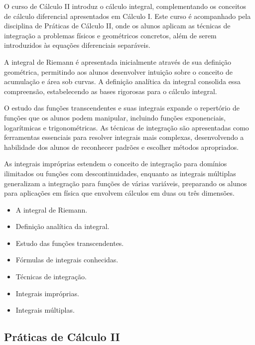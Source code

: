 \documentclass[a4paper, 12pt]{article}
\newcounter{mat}
\begin{document}
O curso de Cálculo II introduz o cálculo integral, complementando os conceitos de
cálculo diferencial apresentados em Cálculo I. Este curso é acompanhado pela disciplina
de Práticas de Cálculo II, onde os alunos aplicam as técnicas de integração a problemas
físicos e geométricos concretos, além de serem introduzidos às equações diferenciais
separáveis.

A integral de Riemann é apresentada inicialmente através de sua definição geométrica,
permitindo aos alunos desenvolver intuição sobre o conceito de acumulação e área sob
curvas. A definição analítica da integral consolida essa compreensão, estabelecendo as
bases rigorosas para o cálculo integral.

O estudo das funções transcendentes e suas integrais expande o repertório de funções
que os alunos podem manipular, incluindo funções exponenciais, logarítmicas e
trigonométricas. As técnicas de integração são apresentadas como ferramentas essenciais
para resolver integrais mais complexas, desenvolvendo a habilidade dos alunos de
reconhecer padrões e escolher métodos apropriados.

As integrais impróprias estendem o conceito de integração para domínios ilimitados ou
funções com descontinuidades, enquanto as integrais múltiplas generalizam a integração
para funções de várias variáveis, preparando os alunos para aplicações em física que
envolvem cálculos em duas ou três dimensões.

\begin{tcolorbox}[title=Ementa:]
    \begin{itemize}
        \item A integral de Riemann.
        \item Definição analítica da integral.
        \item Estudo das funções transcendentes.
        \item Fórmulas de integrais conhecidas.
        \item Técnicas de integração.
        \item Integrais impróprias.
        \item Integrais múltiplas.
    \end{itemize}
\end{tcolorbox}

\subsection{Práticas de Cálculo II}
\label{mat004}
\end{document}
